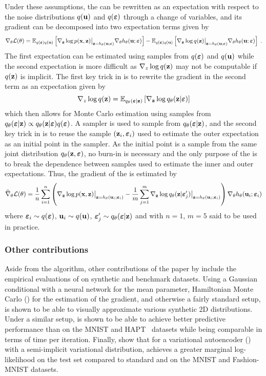 \documentclass[10pt]{article}
\begin{document}
Under these assumptions, the \elbo can be rewritten as an expectation with respect to the noise distributions $q(\mathbf{u})$ and $q(\bm{\varepsilon})$ through a change of variables, and its gradient can be decomposed into two expectation terms given by
\[
\nabla_\theta \mathcal{L}(\theta) = \mathbb{E}_{q(\bm{\varepsilon})q(\mathbf{u})}\left[\nabla_{\mathbf{z}} \log p(\mathbf{x},\mathbf{z})\big|_{\mathbf{z}=h_\theta(\mathbf{u};\bm{\varepsilon})}\nabla_\theta h_\theta(\mathbf{u};\bm{\varepsilon})\right] - \mathbb{E}_{q(\bm{\varepsilon})q(\mathbf{u})}\left[\nabla_{\mathbf{z}} \log q(\mathbf{z})\big|_{\mathbf{z}=h_\theta(\mathbf{u};\bm{\varepsilon})}\nabla_\theta h_\theta(\mathbf{u};\bm{\varepsilon})\right] \;.
\]
The first expectation can be estimated using samples from $q(\bm{\varepsilon})$ and $q(\mathbf{u})$ while the second expectation is more difficult as $\nabla_z\log q(\mathbf{z})$ may not be computable if $q(\mathbf{z})$ is implicit. The first key trick in \uivi is to rewrite the gradient in the second term as an expectation given by
\[
\nabla_z\log q(\mathbf{z}) = \mathbb{E}_{q_\theta(\bm{\varepsilon}|\mathbf{z})}\left[\nabla_{\mathbf{z}}\log q_\theta(\mathbf{z}|\bm{\varepsilon})\right]
\]
which then allows for Monte Carlo estimation using samples from $q_\theta(\bm{\varepsilon}|\mathbf{z})\propto q_\theta(\mathbf{z}|\bm{\varepsilon})q(\bm{\varepsilon})$. A \mcmc sampler is used to sample from $q_\theta(\bm{\varepsilon}|\mathbf{z})$, and the second key trick in \uivi is to reuse the sample $(\mathbf{z}_i,\bm{\varepsilon}_i)$ used to estimate the outer expectation as an initial point in the \mcmc sampler. As the initial point is a sample from the same joint distribution $q_\theta(\mathbf{z},\bm{\varepsilon})$, no burn-in is necessary and the only purpose of the \mcmc is to break the dependence between samples used to estimate the inner and outer expectations. Thus, the gradient of the \elbo is estimated by
\[
\widehat{\nabla}_\theta\mathcal{L}(\theta) = \frac{1}{n}\sum_{i=1}^n \left(\nabla_{\mathbf{z}}\log p(\mathbf{x},\mathbf{z})\big|_{\mathbf{z}=h_\theta(\mathbf{u}_i;\bm{\varepsilon}_i)} - \frac{1}{m}\sum_{j=1}^m \nabla_{\mathbf{z}}\log q_\theta(\mathbf{z}|\bm{\varepsilon}_j')\big|_{\mathbf{z}=h_\theta(\mathbf{u}_i;\bm{\varepsilon}_i)} \right)\nabla_\theta h_\theta(\mathbf{u}_i;\bm{\varepsilon}_i)
\]
where $\bm{\varepsilon}_i\sim q(\bm{\varepsilon})$, $\mathbf{u}_i\sim q(\mathbf{u})$, $\bm{\varepsilon}_j'\sim q_\theta(\bm{\varepsilon}|\mathbf{z})$ and with $n=1$, $m=5$ said to be used in practice.

\subsubsection{Other contributions}

Aside from the \uivi algorithm, other contributions of the paper by \citet{Titsias:2019} include the empirical evaluations of \uivi on synthetic and benchmark datasets. Using a Gaussian conditional with a neural network for the mean parameter, Hamiltonian Monte Carlo (\hmc) for the \mcmc estimation of the \elbo gradient, and otherwise a fairly standard setup, \uivi is shown to be able to visually approximate various synthetic 2D distributions. Under a similar setup, \uivi is shown to be able to achieve better predictive performance than \sivi on the MNIST and HAPT~\citep{Reyes:2014} datasets while being comparable in terms of time per iteration. Finally, \citet{Titsias:2019} show that for a variational autoencoder (\vae)~\citep{Kingma:2013} with a semi-implicit variational distribution, \uivi achieves a greater marginal log-likelihood on the test set compared to standard \vae and \sivi on the MNIST and Fashion-MNIST datasets.
\end{document}
